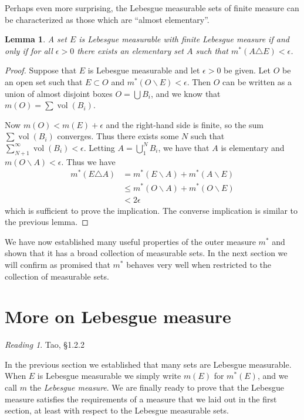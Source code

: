 \documentclass[11pt,oneside]{amsbook}
\renewcommand{\setminus}{\smallsetminus}
\DeclareMathOperator{\vol}{vol}
\theoremstyle{definition}
\theoremstyle{plain}
\newtheorem{lem}[thm]{Lemma}
\theoremstyle{definition}
\theoremstyle{remark}
\newtheorem*{reading}{Reading}
\numberwithin{equation}{section}
\numberwithin{figure}{section}
\begin{document}
Perhaps even more surprising, the Lebesgue measurable sets of finite measure can be characterized as those which are ``almost elementary''.

\begin{lem}
  A set $E$ is Lebesgue measurable with finite Lebesgue measure if and only if for all $\epsilon>0$ there exists an elementary set $A$ such that $m^*(A\triangle E)<\epsilon$.
\end{lem}

\begin{proof}
  Suppose that $E$ is Lebesgue measurable and let $\epsilon>0$ be given. Let $O$ be an open set such that $E\subset O$ and $m^*(O\setminus E)<\epsilon$. Then $O$ can be written as a union of almost disjoint boxes $O=\bigcup B_i$, and we know that $m(O)=\sum\vol(B_i)$.

  Now $m(O)<m(E)+\epsilon$ and the right-hand side is finite, so the sum $\sum\vol(B_i)$ converges. Thus there exists some $N$ such that $\sum_{N+1}^\infty\vol(B_i)<\epsilon$. Letting $A=\bigcup_1^NB_i$, we have that $A$ is elementary and $m(O\setminus A)<\epsilon$. Thus we have
  \begin{align*}
    m^*(E\triangle A)&=m^*(E\setminus A)+m^*(A\setminus E)\\
                     &\leq m^*(O\setminus A)+m^*(O\setminus E)\\
                     &<2\epsilon
  \end{align*}
  which is sufficient to prove the implication. The converse implication is similar to the previous lemma.
\end{proof}

We have now established many useful properties of the outer measure $m^*$ and shown that it has a broad collection of measurable sets. In the next section we will confirm as promised that $m^*$ behaves very well when restricted to the collection of measurable sets.


\section{More on Lebesgue measure}

\begin{reading}
  Tao, \S 1.2.2
\end{reading}

In the previous section we established that many sets are Lebesgue measurable. When $E$ is Lebesgue measurable we simply write $m(E)$ for $m^*(E)$, and we call $m$ the \emph{Lebesgue measure}. We are finally ready to prove that the Lebesgue measure satisfies the requirements of a measure that we laid out in the first section, at least with respect to the Lebesgue measurable sets.
\end{document}
